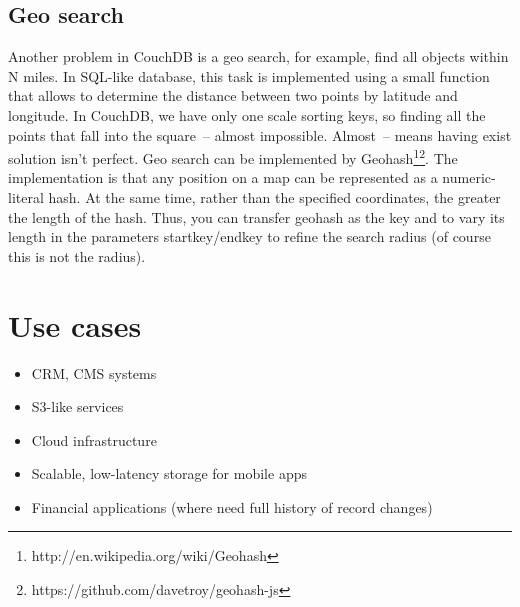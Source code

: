 \subsection{Geo search}

Another problem in CouchDB is a geo search, for example, find all objects within N miles. In SQL-like database, this task is implemented using a small function that allows to determine the distance between two points by latitude and longitude. In CouchDB, we have only one scale sorting keys, so finding all the points that fall into the square~-- almost impossible. Almost~-- means having exist solution isn’t perfect. Geo search can be implemented by Geohash\footnote{http://en.wikipedia.org/wiki/Geohash}\footnote{https://github.com/davetroy/geohash-js}. The implementation is that any position on a map can be represented as a numeric-literal hash. At the same time, rather than the specified coordinates, the greater the length of the hash. Thus, you can transfer geohash as the key and to vary its length in the parameters startkey/endkey to refine the search radius (of course this is not the radius).


\section{Use cases}

\begin{itemize}
  \item CRM, CMS systems
  \item S3-like services
  \item Cloud infrastructure
  \item Scalable, low-latency storage for mobile apps
  \item Financial applications (where need full history of record changes)
\end{itemize}